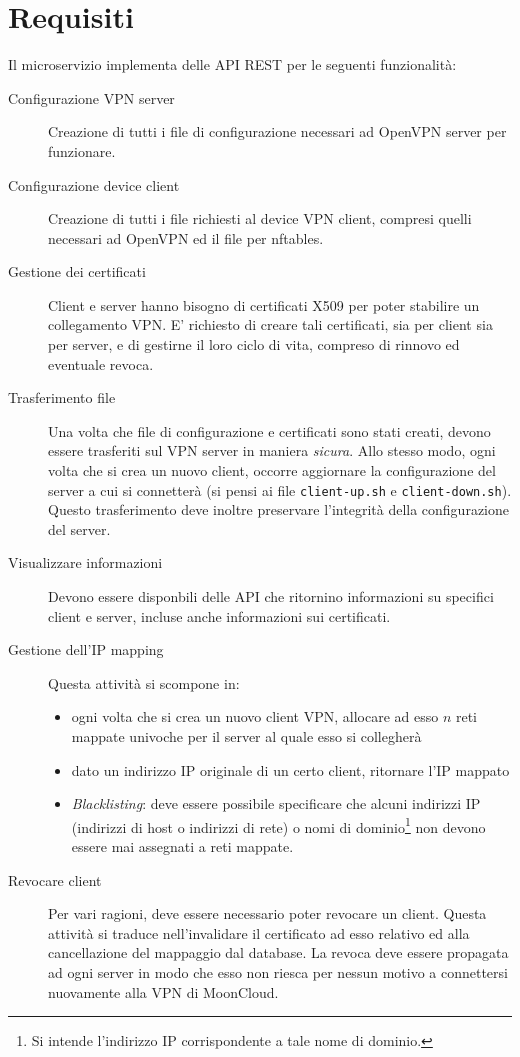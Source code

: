 \section{Requisiti}
Il microservizio implementa delle API REST per le seguenti funzionalità:
\begin{description}
  \item[Configurazione VPN server]Creazione di tutti i file di configurazione
  necessari ad OpenVPN server per funzionare.
  \item[Configurazione device client]Creazione di tutti i file richiesti al
  device VPN client, compresi quelli necessari ad OpenVPN ed il file per nftables.
  \item[Gestione dei certificati]Client e server hanno bisogno di certificati
  X509 per poter stabilire un collegamento VPN. E' richiesto di creare tali
  certificati, sia per client sia per server, e di gestirne il loro ciclo di vita,
  compreso di rinnovo ed eventuale revoca.
  \item[Trasferimento file]Una volta che file di configurazione e certificati
  sono stati creati, devono essere trasferiti sul VPN server in maniera \textit{sicura}.
  Allo stesso modo, ogni volta che si crea un nuovo client, occorre aggiornare
  la configurazione del server a cui si connetterà (si pensi ai file \texttt{client-up.sh}
  e \texttt{client-down.sh}). Questo trasferimento deve inoltre preservare l'integrità
  della configurazione del server.
  \item[Visualizzare informazioni]Devono essere disponbili delle API che ritornino informazioni
  su specifici client e server, incluse anche informazioni sui certificati.
  \item[Gestione dell'IP mapping]Questa attività si scompone in:
  \begin{itemize}
    \item ogni volta che si crea un nuovo client VPN, allocare ad esso $n$ reti mappate
    univoche per il server al quale esso si collegherà
    \item dato un indirizzo IP originale di un certo client, ritornare l'IP mappato
    \item \textit{Blacklisting}: deve essere possibile specificare che alcuni indirizzi
    IP (indirizzi di host o indirizzi di rete) o nomi di dominio\footnote{Si intende
    l'indirizzo IP corrispondente a tale nome di dominio.} non devono essere mai assegnati
    a reti mappate.
  \end{itemize}
  \item[Revocare client]Per vari ragioni, deve essere necessario poter revocare un
  client. Questa attività si traduce nell'invalidare il certificato ad esso relativo
  ed alla cancellazione del mappaggio dal database.
  La revoca deve essere propagata ad ogni server in modo che esso non riesca per nessun
  motivo a connettersi nuovamente alla VPN di MoonCloud.
\end{description}

